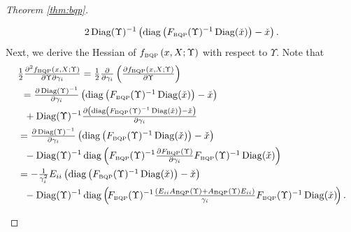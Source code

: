 \documentclass[smallextended]{svjour3hack}       %
\DeclareMathOperator{\Diag}{Diag}
\DeclareMathOperator{\diag}{diag}
\begin{document}
\begin{proof}[Theorem \ref{thm:bqp}]
\begin{itemize}
\begin{align*}
2\Diag(\Upsilon)^{-1}\left(\diag\left(F_{{\tiny\mbox{BQP}}}(\Upsilon)^{-1}\Diag(\check{x})\right)-\check{x}\right).
    \end{align*}
   Next, we derive the Hessian of $f_{{\tiny\mbox{BQP}}}\left(x,X;\Upsilon\right)$ with respect to $\Upsilon$. Note that
    \begin{align*}
    &\textstyle\frac{1}{2}\frac{\partial^2 f_{{\tiny\mbox{BQP}}}\left(x,X;\Upsilon\right)}{\partial \Upsilon \partial \gamma_i}
    = \frac{1}{2}\frac{\partial}{\partial\gamma_i}\left(\frac{\partial f_{{\tiny\mbox{BQP}}}\left(x,X;\Upsilon\right)}{\partial \Upsilon}\right)\\
    &~ = \textstyle \frac{\partial \Diag(\Upsilon)^{-1}}{\partial\gamma_i} \left(\diag\left(F_{{\tiny\mbox{BQP}}}(\Upsilon)^{-1}\Diag(\check{x})\right)-\check{x}\right)
    \\
    &~~  +\Diag(\Upsilon)^{-1}  \textstyle\frac{\partial \left(\diag\left(F_{{\tiny\mbox{BQP}}}(\Upsilon)^{-1}\Diag(\check{x})\right)-\check{x} \right)}{\partial\gamma_i} \\
    &=  \textstyle\frac{\partial \Diag(\Upsilon)^{-1}}{\partial\gamma_i} \left(\diag\left(F_{{\tiny\mbox{BQP}}}(\Upsilon)^{-1}\Diag(\check{x})\right)-\check{x}\right)\\
    &~~ -\Diag(\Upsilon)^{-1}  \diag\left(F_{{\tiny\mbox{BQP}}}(\Upsilon)^{-1} \textstyle\frac{\partial F_{{\tiny\mbox{BQP}}}(\Upsilon)}{\partial\gamma_i}F_{{\tiny\mbox{BQP}}}(\Upsilon)^{-1}\Diag(\check{x})\right) \\
    &= -\textstyle\frac{1}{\gamma_i^2}E_{ii}\left(\diag\left(F_{{\tiny\mbox{BQP}}}(\Upsilon)^{-1}\Diag(\check{x})\right)-\check{x}\right)\\
    &~~  - \Diag(\Upsilon)^{-1}\diag\left(\!F_{{\tiny\mbox{BQP}}}(\Upsilon)^{-1}\textstyle\frac{\left(E_{ii}A_{{\tiny\mbox{BQP}}}(\Upsilon)+A_{{\tiny\mbox{BQP}}}(\Upsilon) E_{ii}\right)}{\gamma_i}
  F_{{\tiny\mbox{BQP}}}(\Upsilon)^{-1}\Diag(\check{x})\!\right).

\end{align*}
\end{itemize}
\end{proof}
\end{document}
